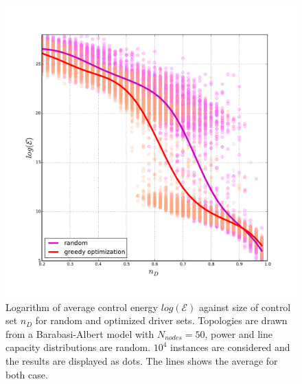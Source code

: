 \documentclass[conference]{IEEEtran}
\begin{document}

\begin{figure}
\includegraphics[scale=.35]{./figure_3/figure_3}
\caption{Logarithm of average control energy $log(\mathcal{E})$ against size of control set $n_D$ for random and optimized driver sets. Topologies are drawn from a Barabasi-Albert model with $ N_{nodes} = 50 $, power and line capacity distributions are random. $10^4$ instances are considered and the results are displayed as dots. The lines shows the average for both case. }
\label{fig:densities}
\end{figure}
\end{document}
